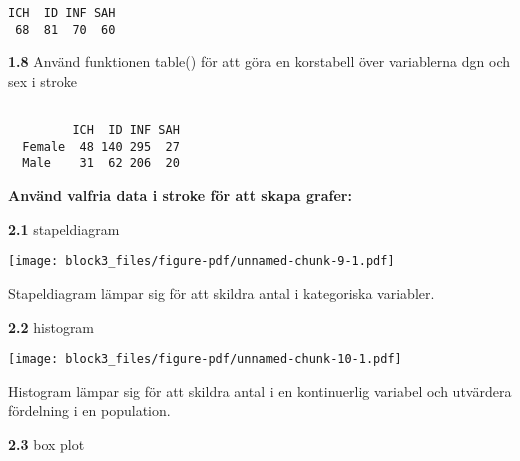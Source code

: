 \documentclass[
  letterpaper,
  DIV=11,
  numbers=noendperiod]{scrartcl}
\newenvironment{Shaded}{\begin{snugshade}}{\end{snugshade}}
\newcommand{\FunctionTok}[1]{\textcolor[rgb]{0.28,0.35,0.67}{#1}}
\newcommand{\NormalTok}[1]{\textcolor[rgb]{0.00,0.23,0.31}{#1}}
\newcommand{\SpecialCharTok}[1]{\textcolor[rgb]{0.37,0.37,0.37}{#1}}
\begin{document}
\begin{verbatim}
ICH  ID INF SAH 
 68  81  70  60 
\end{verbatim}

\textbf{1.8} Använd funktionen table() för att göra en korstabell över
variablerna dgn och sex i stroke

\begin{Shaded}
\end{Shaded}

\begin{verbatim}
        
         ICH  ID INF SAH
  Female  48 140 295  27
  Male    31  62 206  20
\end{verbatim}

\textbf{Använd valfria data i stroke för att skapa grafer:}

\textbf{2.1} stapeldiagram

\begin{Shaded}
\end{Shaded}

\texttt{[image: block3\_files/figure-pdf/unnamed-chunk-9-1.pdf]}

Stapeldiagram lämpar sig för att skildra antal i kategoriska variabler.

\textbf{2.2} histogram

\begin{Shaded}
\end{Shaded}

\texttt{[image: block3\_files/figure-pdf/unnamed-chunk-10-1.pdf]}

Histogram lämpar sig för att skildra antal i en kontinuerlig variabel
och utvärdera fördelning i en population.

\textbf{2.3} box plot

\begin{Shaded}
\end{Shaded}
\end{document}
